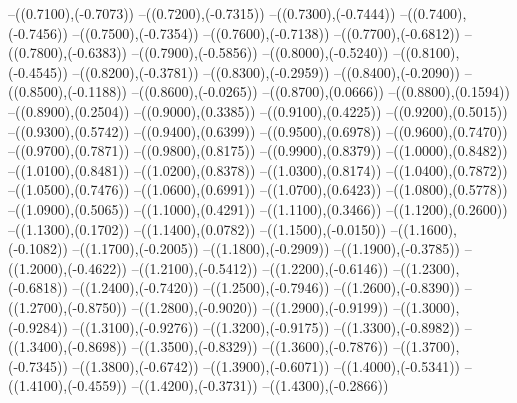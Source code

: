 {	--({\sx*(0.7100)},{\sy*(-0.7073)})
	--({\sx*(0.7200)},{\sy*(-0.7315)})
	--({\sx*(0.7300)},{\sy*(-0.7444)})
	--({\sx*(0.7400)},{\sy*(-0.7456)})
	--({\sx*(0.7500)},{\sy*(-0.7354)})
	--({\sx*(0.7600)},{\sy*(-0.7138)})
	--({\sx*(0.7700)},{\sy*(-0.6812)})
	--({\sx*(0.7800)},{\sy*(-0.6383)})
	--({\sx*(0.7900)},{\sy*(-0.5856)})
	--({\sx*(0.8000)},{\sy*(-0.5240)})
	--({\sx*(0.8100)},{\sy*(-0.4545)})
	--({\sx*(0.8200)},{\sy*(-0.3781)})
	--({\sx*(0.8300)},{\sy*(-0.2959)})
	--({\sx*(0.8400)},{\sy*(-0.2090)})
	--({\sx*(0.8500)},{\sy*(-0.1188)})
	--({\sx*(0.8600)},{\sy*(-0.0265)})
	--({\sx*(0.8700)},{\sy*(0.0666)})
	--({\sx*(0.8800)},{\sy*(0.1594)})
	--({\sx*(0.8900)},{\sy*(0.2504)})
	--({\sx*(0.9000)},{\sy*(0.3385)})
	--({\sx*(0.9100)},{\sy*(0.4225)})
	--({\sx*(0.9200)},{\sy*(0.5015)})
	--({\sx*(0.9300)},{\sy*(0.5742)})
	--({\sx*(0.9400)},{\sy*(0.6399)})
	--({\sx*(0.9500)},{\sy*(0.6978)})
	--({\sx*(0.9600)},{\sy*(0.7470)})
	--({\sx*(0.9700)},{\sy*(0.7871)})
	--({\sx*(0.9800)},{\sy*(0.8175)})
	--({\sx*(0.9900)},{\sy*(0.8379)})
	--({\sx*(1.0000)},{\sy*(0.8482)})
	--({\sx*(1.0100)},{\sy*(0.8481)})
	--({\sx*(1.0200)},{\sy*(0.8378)})
	--({\sx*(1.0300)},{\sy*(0.8174)})
	--({\sx*(1.0400)},{\sy*(0.7872)})
	--({\sx*(1.0500)},{\sy*(0.7476)})
	--({\sx*(1.0600)},{\sy*(0.6991)})
	--({\sx*(1.0700)},{\sy*(0.6423)})
	--({\sx*(1.0800)},{\sy*(0.5778)})
	--({\sx*(1.0900)},{\sy*(0.5065)})
	--({\sx*(1.1000)},{\sy*(0.4291)})
	--({\sx*(1.1100)},{\sy*(0.3466)})
	--({\sx*(1.1200)},{\sy*(0.2600)})
	--({\sx*(1.1300)},{\sy*(0.1702)})
	--({\sx*(1.1400)},{\sy*(0.0782)})
	--({\sx*(1.1500)},{\sy*(-0.0150)})
	--({\sx*(1.1600)},{\sy*(-0.1082)})
	--({\sx*(1.1700)},{\sy*(-0.2005)})
	--({\sx*(1.1800)},{\sy*(-0.2909)})
	--({\sx*(1.1900)},{\sy*(-0.3785)})
	--({\sx*(1.2000)},{\sy*(-0.4622)})
	--({\sx*(1.2100)},{\sy*(-0.5412)})
	--({\sx*(1.2200)},{\sy*(-0.6146)})
	--({\sx*(1.2300)},{\sy*(-0.6818)})
	--({\sx*(1.2400)},{\sy*(-0.7420)})
	--({\sx*(1.2500)},{\sy*(-0.7946)})
	--({\sx*(1.2600)},{\sy*(-0.8390)})
	--({\sx*(1.2700)},{\sy*(-0.8750)})
	--({\sx*(1.2800)},{\sy*(-0.9020)})
	--({\sx*(1.2900)},{\sy*(-0.9199)})
	--({\sx*(1.3000)},{\sy*(-0.9284)})
	--({\sx*(1.3100)},{\sy*(-0.9276)})
	--({\sx*(1.3200)},{\sy*(-0.9175)})
	--({\sx*(1.3300)},{\sy*(-0.8982)})
	--({\sx*(1.3400)},{\sy*(-0.8698)})
	--({\sx*(1.3500)},{\sy*(-0.8329)})
	--({\sx*(1.3600)},{\sy*(-0.7876)})
	--({\sx*(1.3700)},{\sy*(-0.7345)})
	--({\sx*(1.3800)},{\sy*(-0.6742)})
	--({\sx*(1.3900)},{\sy*(-0.6071)})
	--({\sx*(1.4000)},{\sy*(-0.5341)})
	--({\sx*(1.4100)},{\sy*(-0.4559)})
	--({\sx*(1.4200)},{\sy*(-0.3731)})
	--({\sx*(1.4300)},{\sy*(-0.2866)})
}
